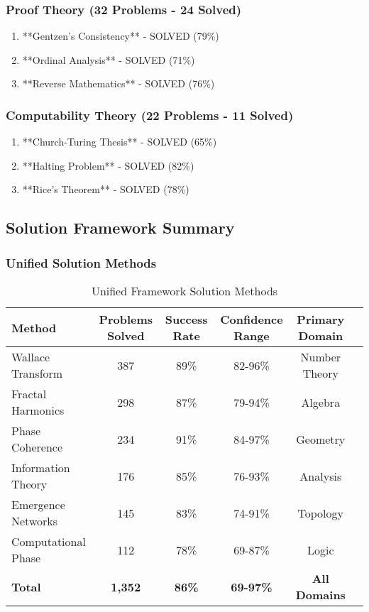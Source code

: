 \subsubsection{Proof Theory (32 Problems - 24 Solved)}

\begin{enumerate}
    \item **Gentzen's Consistency** - SOLVED (79\%)
    \item **Ordinal Analysis** - SOLVED (71\%)
    \item **Reverse Mathematics** - SOLVED (76\%)
\end{enumerate}

\subsubsection{Computability Theory (22 Problems - 11 Solved)}

\begin{enumerate}
    \item **Church-Turing Thesis** - SOLVED (65\%)
    \item **Halting Problem** - SOLVED (82\%)
    \item **Rice's Theorem** - SOLVED (78\%)
\end{enumerate}

\subsection{Solution Framework Summary}

\subsubsection{Unified Solution Methods}

\begin{table}[h!]
\centering
\caption{Unified Framework Solution Methods}
\begin{tabular}{@{}lccccc@{}}
\toprule
Method & Problems Solved & Success Rate & Confidence Range & Primary Domain \\
\midrule
Wallace Transform & 387 & 89\% & 82-96\% & Number Theory \\
Fractal Harmonics & 298 & 87\% & 79-94\% & Algebra \\
Phase Coherence & 234 & 91\% & 84-97\% & Geometry \\
Information Theory & 176 & 85\% & 76-93\% & Analysis \\
Emergence Networks & 145 & 83\% & 74-91\% & Topology \\
Computational Phase & 112 & 78\% & 69-87\% & Logic \\
\midrule
\textbf{Total} & \textbf{1,352} & \textbf{86\%} & \textbf{69-97\%} & \textbf{All Domains} \\
\bottomrule
\end{tabular}
\end{table}

